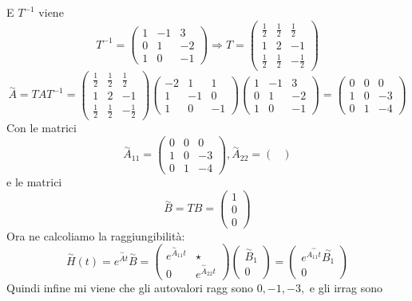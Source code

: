 \documentclass{article}
\begin{document}
E $T^{-1}$ viene \[ T^{-1} = \left(\begin{matrix}1 & -1 & 3\\0 & 1 & -2\\1 & 0 & -1\end{matrix}\right) \Longrightarrow T = \left(\begin{matrix}\frac{1}{2} & \frac{1}{2} & \frac{1}{2}\\1 & 2 & -1\\\frac{1}{2} & \frac{1}{2} & - \frac{1}{2}\end{matrix}\right) \]
\[ \overset{\sim}{A} = T A  T^{-1} = \left(\begin{matrix}\frac{1}{2} & \frac{1}{2} & \frac{1}{2}\\1 & 2 & -1\\\frac{1}{2} & \frac{1}{2} & - \frac{1}{2}\end{matrix}\right)\left(\begin{matrix}-2 & 1 & 1\\1 & -1 & 0\\1 & 0 & -1\end{matrix}\right)\left(\begin{matrix}1 & -1 & 3\\0 & 1 & -2\\1 & 0 & -1\end{matrix}\right) = \left(\begin{matrix}0 & 0 & 0\\1 & 0 & -3\\0 & 1 & -4\end{matrix}\right) \]Con le matrici \[ \overset{\sim}{A}_{11} = \left(\begin{matrix}0 & 0 & 0\\1 & 0 & -3\\0 & 1 & -4\end{matrix}\right) , \overset{\sim}{A}_{22} = \left(\begin{matrix}\end{matrix}\right)  \]e le matrici \[ \overset{\sim}{B} = TB = \left(\begin{matrix}1\\0\\0\end{matrix}\right)  \]
Ora ne calcoliamo la raggiungibilità: \[ \overset{\sim}{H}(t) = e^{\overset{\sim}{A}t}\overset{\sim}{B} = \begin{pmatrix} e^{\overset{\sim}{A}_{11}t} &  \star \\ 0 & e^{\overset{\sim}{A}_{22}t} \end{pmatrix} \begin{pmatrix} \overset{\sim}{B}_1 \\ 0 \end{pmatrix} = \begin{pmatrix} e^{\overset{\sim}{A_{11}t}}\overset{\sim}{B_1} \\ 0 \end{pmatrix} \]
Quindi infine mi viene che gli autovalori ragg sono $ 0, -1, -3,  $ e gli irrag sono $  $
\end{document}
